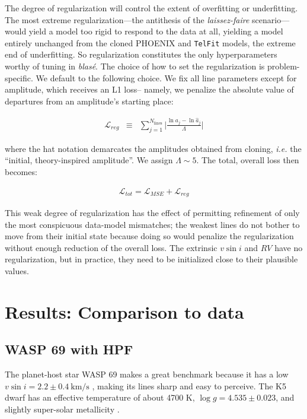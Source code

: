 \documentclass[twocolumn]{aastex631}
\begin{document}
The degree of regularization will control the extent of overfitting or underfitting. The most extreme regularization---the antithesis of the \emph{laissez-faire} scenario---would yield a model too rigid to respond to the data at all, yielding a model entirely unchanged from the cloned PHOENIX and \texttt{TelFit} models, the extreme end of underfitting.  So regularization constitutes the only hyperparameters worthy of tuning in \emph{blas\'e}.  The choice of how to set the regularization is problem-specific.  We default to the following choice. We fix all line parameters except for amplitude, which receives an L1 loss-- namely, we penalize the absolute value of departures from an amplitude's starting place:

\begin{eqnarray}
    \mathcal{L}_{reg} &\equiv& \sum_{j=1}^{N_\mathrm{lines}} \Big|\frac{\ln{a_j} - \ln{\hat{a}_j}}{\Lambda}\Big|
\end{eqnarray}

\noindent where the hat notation demarcates the amplitudes obtained from cloning, \emph{i.e.} the ``initial, theory-inspired amplitude''.  We assign $\Lambda\sim5$.  The total, overall loss then becomes:

\begin{eqnarray}
    \mathcal{L}_{tot} = \mathcal{L}_{MSE} + \mathcal{L}_{reg}
\end{eqnarray}

This weak degree of regularization has the effect of permitting refinement of only the most conspicuous data-model mismatches; the weakest lines do not bother to move from their initial state because doing so would penalize the regularization without enough reduction of the overall loss.  The extrinsic $v\sin{i}$ and $RV$ have no regularization, but in practice, they need to be initialized close to their plausible values.

\section{Results: Comparison to data}\label{secResults}
\subsection{WASP 69 with HPF}

The planet-host star WASP 69 makes a great benchmark because it has a low $v\sin{i}=2.2\pm0.4~\text{km/s}$ \citep{2017A&A...608A.135C}, making its lines sharp and easy to perceive.  The K5 dwarf has an effective temperature of about 4700 K, $\log{g}=4.535\pm0.023$, and slightly super-solar metallicity \citep{2014MNRAS.445.1114A}.
\end{document}
